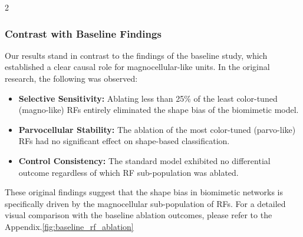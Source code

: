 \begin{multicols}{2}
\subsubsection{Contrast with Baseline Findings}

Our results stand in contrast to the findings of the baseline study, which established a clear causal role for magnocellular-like units. In the original research, the following was observed:

\begin{itemize}
    \item \textbf{Selective Sensitivity:} Ablating less than 25\% of the least color-tuned (magno-like) RFs entirely eliminated the shape bias of the biomimetic model.
    
    \item \textbf{Parvocellular Stability:} The ablation of the most color-tuned (parvo-like) RFs had no significant effect on shape-based classification.
    
    \item \textbf{Control Consistency:} The standard model exhibited no differential outcome regardless of which RF sub-population was ablated.
\end{itemize}


These original findings suggest that the shape bias in biomimetic networks is specifically driven by the magnocellular sub-population of RFs. For a detailed visual comparison with the baseline ablation outcomes, please refer to the Appendix.\ref{fig:baseline_rf_ablation}



\end{multicols}



